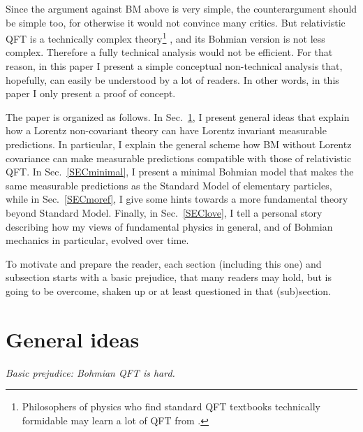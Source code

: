 \documentclass[12pt]{article}
\begin{document}
Since the argument against BM above is very simple, 
the counterargument should be simple too, for otherwise it would not convince many critics. 
But relativistic QFT is a technically complex theory\footnote{Philosophers of physics 
who find standard QFT textbooks technically formidable may learn a lot of QFT from \cite{teller}.}
\cite{bd2,ryder,chengli,schwartz}, 
and its Bohmian version is not less complex. 
Therefore a fully technical analysis would not be efficient.
For that reason, in this paper I present a simple conceptual non-technical analysis that,
hopefully, can easily be understood by a lot of readers. 
In other words, in this paper I only present a proof of concept.

The paper is organized as follows. In Sec.~\ref{SECgenid}, I present general ideas that explain how 
a Lorentz non-covariant theory can have Lorentz invariant measurable predictions. In particular,
I explain the general scheme how BM without Lorentz covariance can make measurable predictions
compatible with those of relativistic QFT. 
In Sec.~\ref{SECminimal}, I present a minimal Bohmian model that makes the same measurable predictions as 
the Standard Model of elementary particles, while in Sec.~\ref{SECmoref}, I give some hints 
towards a more fundamental theory beyond Standard Model.
Finally, in Sec.~\ref{SEClove}, I tell a personal story describing how my views of fundamental physics
in general, and of Bohmian mechanics in particular, evolved over time. 

To motivate and prepare the reader, 
each section (including this one) and subsection starts with a basic prejudice, that many readers may hold, 
but is going to be overcome, shaken up or at least questioned in that (sub)section.

\section{General ideas}
\label{SECgenid}

\begin{flushright}
{\it Basic prejudice: Bohmian QFT is hard.}
\end{flushright}
\end{document}
